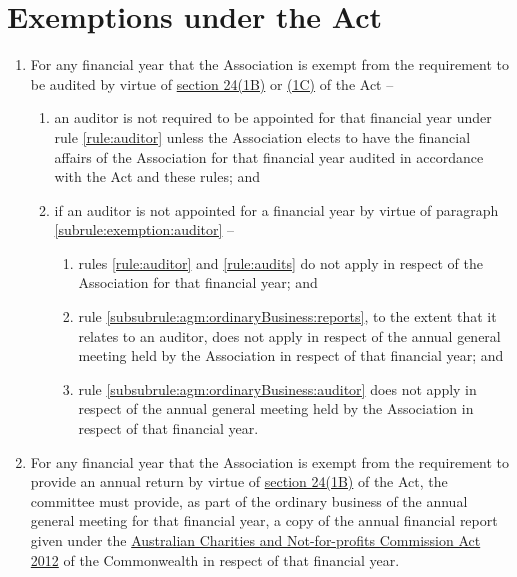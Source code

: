 \documentclass[a4paper,11pt]{article}
\begin{document}
\section{Exemptions under the Act}
\label{rule:exemption}

\begin{enumerate}
	\item For any financial year that the Association is exempt from the requirement to be audited by virtue of \href{https://www.legislation.tas.gov.au/view/html/inforce/current/act-1964-064#GS24@Gs1B@EN}{section 24(1B)} or \href{https://www.legislation.tas.gov.au/view/html/inforce/current/act-1964-064#GS24@Gs1C@EN}{(1C)} of the Act --
	\begin{enumerate}
		\item \label{subrule:exemption:auditor} an auditor is not required to be appointed for that financial year under rule \ref{rule:auditor} unless the Association elects to have the financial affairs of the Association for that financial year audited in accordance with the Act and these rules; and
		
		\item if an auditor is not appointed for a financial year by virtue of paragraph \ref{subrule:exemption:auditor} --
		\begin{enumerate}
			\item rules \ref{rule:auditor} and \ref{rule:audits} do not apply in respect of the Association for that financial year; and
			\item rule \ref{subsubrule:agm:ordinaryBusiness:reports}, to the extent that it relates to an auditor, does not apply in respect of the annual general meeting held by the Association in respect of that financial year; and
			\item rule \ref{subsubrule:agm:ordinaryBusiness:auditor} does not apply in respect of the annual general meeting held by the Association in respect of that financial year.
		\end{enumerate}
	\end{enumerate}
	
	\item For any financial year that the Association is exempt from the requirement to provide an annual return by virtue of \href{https://www.legislation.tas.gov.au/view/html/inforce/current/act-1964-064#GS24@Gs1B@EN}{section 24(1B)} of the Act, the committee must provide, as part of the ordinary business of the annual general meeting for that financial year, a copy of the annual financial report given under the \href{https://www.legislation.gov.au/Details/C2016C00306}{Australian Charities and Not-for-profits Commission Act 2012} of the Commonwealth in respect of that financial year.
\end{enumerate}
\end{document}
